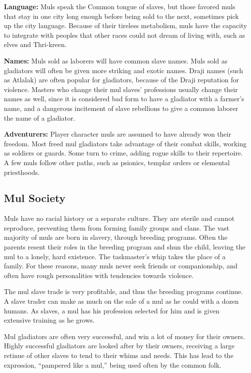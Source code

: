 \textbf{Language:} Muls speak the Common tongue of slaves, but those favored muls that stay in one city long enough before being sold to the next, sometimes pick up the city language. Because of their tireless metabolism, muls have the capacity to integrate with peoples that other races could not dream of living with, such as elves and Thri-kreen.

\textbf{Names:} Muls sold as laborers will have common slave names. Muls sold as gladiators will often be given more striking and exotic names. Draji names (such as Atlalak) are often popular for gladiators, because of the Draji reputation for violence. Masters who change their mul slaves' professions usually change their names as well, since it is considered bad form to have a gladiator with a farmer's name, and a dangerous incitement of slave rebellions to give a common laborer the name of a gladiator.

\textbf{Adventurers:} Player character muls are assumed to have already won their freedom. Most freed mul gladiators take advantage of their combat skills, working as soldiers or guards. Some turn to crime, adding rogue skills to their repertoire. A few muls follow other paths, such as psionics, templar orders or elemental priesthoods.

\subsection{Mul Society}
Muls have no racial history or a separate culture. They are sterile and cannot reproduce, preventing them from forming family groups and clans. The vast majority of muls are born in slavery, through breeding programs. Often the parents resent their roles in the breeding program and shun the child, leaving the mul to a lonely, hard existence. The taskmaster's whip takes the place of a family. For these reasons, many muls never seek friends or companionship, and often have rough personalities with tendencies towards violence.

The mul slave trade is very profitable, and thus the breeding programs continue. A slave trader can make as much on the sale of a mul as he could with a dozen humans. As slaves, a mul has his profession selected for him and is given extensive training as he grows.

Mul gladiators are often very successful, and win a lot of money for their owners. Highly successful gladiators are looked after by their owners, receiving a large retinue of other slaves to tend to their whims and needs. This has lead to the expression, ``pampered like a mul,'' being used often by the common folk.

